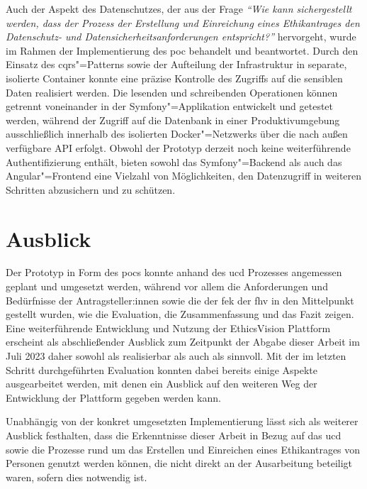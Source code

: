\documentclass[a4paper,12pt,twoside]{scrreprt}
\begin{document}
\medskip

Auch der Aspekt des Datenschutzes, der aus der Frage \textit{\enquote{Wie kann sichergestellt werden, dass der Prozess der Erstellung und Einreichung eines Ethikantrages den Datenschutz- und Datensicherheitsanforderungen entspricht?}} hervorgeht, wurde im Rahmen der Implementierung des \acl{poc} behandelt und beantwortet. Durch den Einsatz des \ac{cqrs}"=Patterns sowie der Aufteilung der Infrastruktur in separate, isolierte Container konnte eine präzise Kontrolle des Zugriffs auf die sensiblen Daten realisiert werden. Die lesenden und schreibenden Operationen können getrennt voneinander in der Symfony"=Applikation entwickelt und getestet werden, während der Zugriff auf die Datenbank in einer Produktivumgebung ausschließlich innerhalb des isolierten Docker"=Netzwerks über die nach außen verfügbare API erfolgt. Obwohl der Prototyp derzeit noch keine weiterführende Authentifizierung enthält, bieten sowohl das Symfony"=Backend als auch das Angular"=Frontend eine Vielzahl von Möglichkeiten, den Datenzugriff in weiteren Schritten abzusichern und zu schützen.

\section{Ausblick}
\label{sec:ausblick}

Der Prototyp in Form des \acl{poc}s konnte anhand des \acl{ucd} Prozesses angemessen geplant und umgesetzt werden, während vor allem die Anforderungen und Bedürfnisse der Antragsteller:innen sowie die der \acl{fek} der \acl{fhv} in den Mittelpunkt gestellt wurden, wie die Evaluation, die Zusammenfassung und das Fazit zeigen. Eine weiterführende Entwicklung und Nutzung der EthicsVision Plattform erscheint als abschließender Ausblick zum Zeitpunkt der Abgabe dieser Arbeit im Juli 2023 daher sowohl als realisierbar als auch als sinnvoll. Mit der im letzten Schritt durchgeführten Evaluation konnten dabei bereits einige Aspekte ausgearbeitet werden, mit denen ein Ausblick auf den weiteren Weg der Entwicklung der Plattform gegeben werden kann.

Unabhängig von der konkret umgesetzten Implementierung lässt sich als weiterer Ausblick festhalten, dass die Erkenntnisse dieser Arbeit in Bezug auf das \acl{ucd} sowie die Prozesse rund um das Erstellen und Einreichen eines Ethikantrages von Personen genutzt werden können, die nicht direkt an der Ausarbeitung beteiligt waren, sofern dies notwendig ist.

\cleardoublepage
{}
{}
\printbibliography
\end{document}
